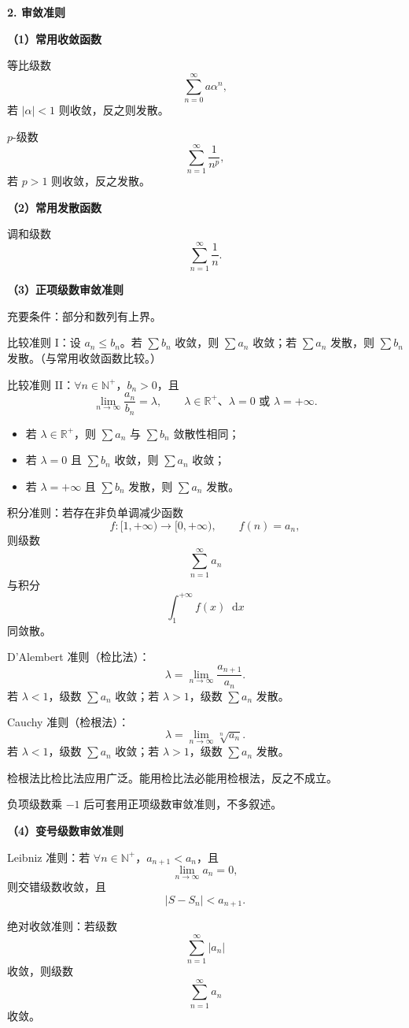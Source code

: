 \documentclass[UTF8,fontset=fandol,zihao=5]{ctexart}
\newcommand{\R}{\mathbb{R}}
\newcommand{\N}{\mathbb{N}}
\newcommand{\dd}{\mathop{}\!\mathrm{d}}
\begin{document}
\textbf{2. 审敛准则}

\textbf{（1）常用收敛函数}

等比级数
\[
\sum_{n=0}^{\infty}a\alpha^n,
\]
若 $|\alpha|<1$ 则收敛，反之则发散。

$p$-级数
\[
\sum_{n=1}^{\infty}\frac1{n^p},
\]
若 $p>1$ 则收敛，反之发散。

\textbf{（2）常用发散函数}

调和级数
\[
\sum_{n=1}^{\infty}\frac1n.
\]

\textbf{（3）正项级数审敛准则}

充要条件：部分和数列有上界。

比较准则 I：设 $a_n\leq b_n$。若 $\sum b_n$ 收敛，则 $\sum a_n$ 收敛；若 $\sum a_n$ 发散，则 $\sum b_n$ 发散。（与常用收敛函数比较。）

比较准则 II：$\forall n\in\N^+$，$b_n>0$，且
\[
\lim_{n\to\infty}\frac{a_n}{b_n}=\lambda,
\qquad \lambda\in\R^+\text{、}\lambda=0\text{ 或 }\lambda=+\infty.
\]

\begin{itemize}
  \item 若 $\lambda\in\R^+$，则 $\sum a_n$ 与 $\sum b_n$ 敛散性相同；
  \item 若 $\lambda=0$ 且 $\sum b_n$ 收敛，则 $\sum a_n$ 收敛；
  \item 若 $\lambda=+\infty$ 且 $\sum b_n$ 发散，则 $\sum a_n$ 发散。
\end{itemize}

积分准则：若存在非负单调减少函数
\[
f:[1,+\infty)\to[0,+\infty),
\qquad f(n)=a_n,
\]
则级数
\[
\sum_{n=1}^{\infty}a_n
\]
与积分
\[
\int_1^{+\infty}f(x)\dd x
\]
同敛散。

D'Alembert 准则（检比法）：
\[
\lambda=\lim_{n\to\infty}\frac{a_{n+1}}{a_n}.
\]
若 $\lambda<1$，级数 $\sum a_n$ 收敛；若 $\lambda>1$，级数 $\sum a_n$ 发散。

Cauchy 准则（检根法）：
\[
\lambda=\lim_{n\to\infty}\sqrt[n]{a_n}.
\]
若 $\lambda<1$，级数 $\sum a_n$ 收敛；若 $\lambda>1$，级数 $\sum a_n$ 发散。

检根法比检比法应用广泛。能用检比法必能用检根法，反之不成立。

负项级数乘 $-1$ 后可套用正项级数审敛准则，不多叙述。

\textbf{（4）变号级数审敛准则}

Leibniz 准则：若 $\forall n\in\N^+$，$a_{n+1}<a_n$，且
\[
\lim_{n\to\infty}a_n=0,
\]
则交错级数收敛，且
\[
|S-S_n|<a_{n+1}.
\]

绝对收敛准则：若级数
\[
\sum_{n=1}^{\infty}|a_n|
\]
收敛，则级数
\[
\sum_{n=1}^{\infty}a_n
\]
收敛。
\end{document}
